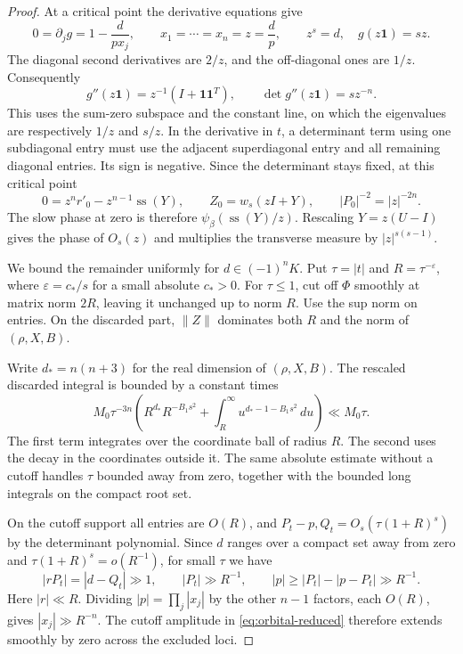 \begin{proof}

At a critical point the derivative equations give
\[
 0=\partial_jg=1-\frac{d}{px_j},\qquad
 x_1=\cdots=x_n=z=\frac{d}{p},\qquad z^s=d,\quad g(z\mathbf 1)=sz .
\]
The diagonal second derivatives are \(2/z\), and the off-diagonal
ones are \(1/z\). Consequently
\[
 g''(z\mathbf 1)=z^{-1}(I+\mathbf 1\mathbf 1^T),\qquad
 \det g''(z\mathbf 1)=sz^{-n}.
\]
This uses the sum-zero subspace and the constant line, on which the
eigenvalues are respectively \(1/z\) and \(s/z\).
In the derivative in \(t\), a determinant term using one subdiagonal
entry must use the adjacent superdiagonal entry and all remaining
diagonal entries. Its sign is negative. Since the determinant stays
fixed, at this critical point
\[
 0=z^n r'_0-z^{n-1}\operatorname{ss}(Y),\qquad
 Z_0=w_s(zI+Y),\qquad |P_0|^{-2}=|z|^{-2n}.
\]
The slow phase at zero is therefore \(\psi_\beta(\operatorname{ss}(Y)/z)\).
Rescaling \(Y=z(U-I)\) gives the phase of \(O_s(z)\) and
multiplies the transverse measure by \(|z|^{s(s-1)}\).


We bound the remainder uniformly for \(d\in (-1)^nK\). Put
\(\tau=|t|\) and \(R=\tau^{-\varepsilon}\), where
\(\varepsilon=c_*/s\) for a small absolute \(c_*>0\). For
\(\tau\le1\), cut off \(\Phi\) smoothly at matrix norm \(2R\),
leaving it unchanged up to norm \(R\). Use the sup norm on entries.
On the discarded part, \(\|Z\|\) dominates both \(R\) and the
norm of \((\rho,X,B)\).

Write \(d_*=n(n+3)\) for the real dimension of \((\rho,X,B)\).
The rescaled discarded integral is bounded by a constant times
\[
 M_0\tau^{-3n}
  \left(R^{d_*}R^{-B_1s^2}+\int_R^\infty u^{d_*-1-B_1s^2}\,du\right)
   \ll M_0\tau .
\]
The first term integrates over the coordinate ball of radius \(R\).
The second uses the decay in the coordinates outside it.
The same absolute estimate without a cutoff handles \(\tau\)
bounded away from zero, together with the bounded long integrals
on the compact root set.

On the cutoff support all entries are \(O(R)\), and
\(P_t-p,Q_t=O_s(\tau(1+R)^s)\) by the determinant polynomial.
Since \(d\) ranges over a compact set away from zero and
\(\tau(1+R)^s=o(R^{-1})\), for small \(\tau\) we have
\[
 |rP_t|=|d-Q_t|\gg1,\qquad
 |P_t|\gg R^{-1},\qquad |p|\ge |P_t|-|p-P_t|\gg R^{-1}.
\]
Here \(|r|\ll R\). Dividing \(|p|=\prod_j|x_j|\) by the other
\(n-1\) factors, each \(O(R)\), gives \(|x_j|\gg R^{-n}\). The cutoff amplitude in \eqref{eq:orbital-reduced}
therefore extends smoothly by zero across the excluded loci.


\end{proof}
